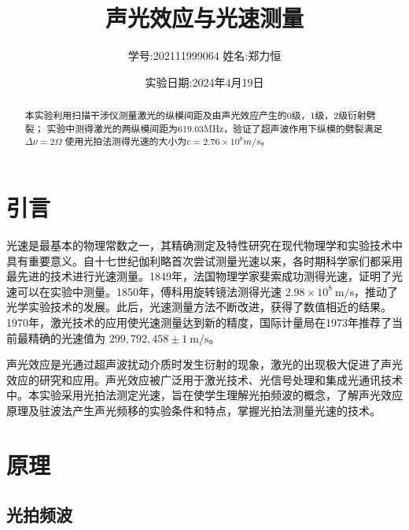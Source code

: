 \documentclass[12pt,a4paper]{article}
\title{\vspace{-4cm}\Large 声光效应与光速测量}  %
\author{\kaishu 学号:202111999064 \hspace{2cm} 姓名:郑力恒}   %
\date{实验日期:2024年4月19日}
\begin{document}
\maketitle

\begin{abstract}
    本实验利用扫描干涉仪测量激光的纵模间距及由声光效应产生的0级，1级，2级衍射劈裂；
实验中测得激光的两纵模间距为619.03MHz，验证了超声波作用下纵模的劈裂满足$\Delta \nu=2\Omega$
使用光拍法测得光速的大小为$c=2.76\times 10^8m/s$。
\end{abstract}

\section{引言}

光速是最基本的物理常数之一，其精确测定及特性研究在现代物理学和实验技术中具有重要意义。自十七世纪伽利略首次尝试测量光速以来，各时期科学家们都采用最先进的技术进行光速测量。1849年，法国物理学家斐索成功测得光速，证明了光速可以在实验中测量。1850年，傅科用旋转镜法测得光速 $2.98 \times 10^8 \ \text{m/s}$，推动了光学实验技术的发展。此后，光速测量方法不断改进，获得了数值相近的结果。1970年，激光技术的应用使光速测量达到新的精度，国际计量局在1973年推荐了当前最精确的光速值为 $299,792,458 \pm 1 \ \text{m/s}$。

声光效应是光通过超声波扰动介质时发生衍射的现象，激光的出现极大促进了声光效应的研究和应用。声光效应被广泛用于激光技术、光信号处理和集成光通讯技术中。本实验采用光拍法测定光速，旨在使学生理解光拍频波的概念，了解声光效应原理及驻波法产生声光频移的实验条件和特点，掌握光拍法测量光速的技术。

\section{原理}
\subsection{光拍频波}
\end{document}
